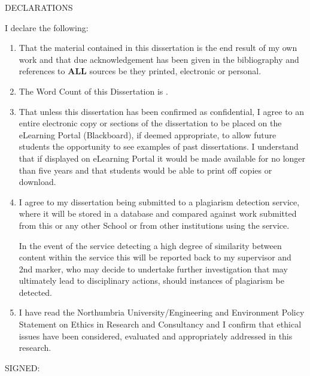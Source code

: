DECLARATIONS

I declare the following:

\begin{enumerate}
    \item That the material contained in this dissertation is the end result of my own work and that due acknowledgement
          has been given in the bibliography and references to \textbf{ALL} sources be they printed, electronic or personal.

    \item The Word Count of this Dissertation is \wordcount.

    \item That unless this dissertation has been confirmed as confidential, I agree to an entire electronic copy or sections
          of the dissertation to be placed on the eLearning Portal (Blackboard), if deemed appropriate, to allow future students
          the opportunity to see examples of past dissertations. I understand that if displayed on eLearning Portal it would be
          made available for no longer than five years and that students would be able to print off copies or download.

    \item I agree to my dissertation being submitted to a plagiarism detection service, where it will be stored in a database
          and compared against work submitted from this or any other School or from other institutions using the service.

          In the event of the service detecting a high degree of similarity between content within the service this will
          be reported back to my supervisor and 2nd marker, who may decide to undertake further investigation that may
          ultimately lead to disciplinary actions, should instances of plagiarism be detected.

    \item I have read the Northumbria University/Engineering and Environment Policy Statement on Ethics in Research and Consultancy
          and I confirm that ethical issues have been considered, evaluated and appropriately addressed in this research.
\end{enumerate}

SIGNED:

